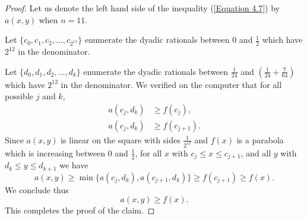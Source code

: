 \documentclass[12pt]{ucthesis}
\theoremstyle{plain}
\theoremstyle{definition}
\begin{document}
\begin{proof}
Let us denote the left hand side of the inequality (\ref{Equation 4.7}) by $a(x, y)$
when $n = 11$.

Let $\{c_0, c_1, c_2, \dots, c_{2^{11}}\}$ enumerate the dyadic rationals
between $0$ and $\frac{1}{2}$ which have $2^{12}$ in the denominator.

Let $\{d_0, d_1, d_2, \dots, d_k\}$ enumerate the dyadic rationals
between $\frac{1}{24}$ and $(\frac{1}{24} + \frac{7}{64})$ which have $2^{12}$
in the denominator.
We verified on the computer that for all possible $j$ and $k$,
\begin{align*}
a(c_j, d_k) & \ge f(c_j), \\
a(c_j, d_k) & \ge f(c_{j + 1}).
\end{align*}
Since $a(x, y)$ is linear on the square with sides $\frac{1}{2^{12}}$
and $f(x)$ is a parabola which is increasing between $0$ and $\frac{1}{2}$,
for all $x$ with $c_j \le x \le c_{j + 1}$, and all $y$ with $d_k \le y \le d_{k + 1}$
we have
\begin{equation*}
a(x, y) \ge \min\{a(c_j, d_k), a(c_{j + 1}, d_k)\} \ge f(c_{j + 1}) \ge f(x).
\end{equation*}
We conclude thus
\begin{equation*}
a(x, y) \ge f(x).
\end{equation*}
This completes the proof of the claim.
\end{proof}
\end{document}
